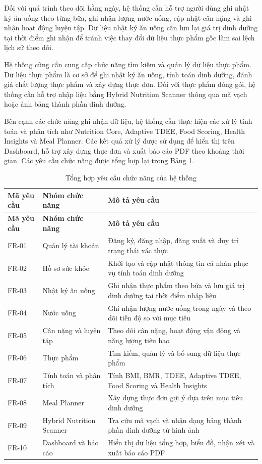\documentclass[12pt, a4paper]{report}
\begin{document}
Đối với quá trình theo dõi hằng ngày, hệ thống cần hỗ trợ người dùng ghi nhật ký ăn uống theo từng bữa, ghi nhận lượng nước uống, cập nhật cân nặng và ghi nhận hoạt động luyện tập. Dữ liệu nhật ký ăn uống cần lưu lại giá trị dinh dưỡng tại thời điểm ghi nhận để tránh việc thay đổi dữ liệu thực phẩm gốc làm sai lệch lịch sử theo dõi.

Hệ thống cũng cần cung cấp chức năng tìm kiếm và quản lý dữ liệu thực phẩm. Dữ liệu thực phẩm là cơ sở để ghi nhật ký ăn uống, tính toán dinh dưỡng, đánh giá chất lượng thực phẩm và xây dựng thực đơn. Đối với thực phẩm đóng gói, hệ thống cần hỗ trợ nhập liệu bằng Hybrid Nutrition Scanner thông qua mã vạch hoặc ảnh bảng thành phần dinh dưỡng.

Bên cạnh các chức năng ghi nhận dữ liệu, hệ thống cần thực hiện các xử lý tính toán và phân tích như Nutrition Core, Adaptive TDEE, Food Scoring, Health Insights và Meal Planner. Các kết quả xử lý được sử dụng để hiển thị trên Dashboard, hỗ trợ xây dựng thực đơn và xuất báo cáo PDF theo khoảng thời gian. Các yêu cầu chức năng được tổng hợp lại trong Bảng \ref{tab:tong_hop_chuc_nang_2}.

\begin{longtable}{|>{\raggedright\arraybackslash}p{4cm}|>{\raggedright\arraybackslash}p{4cm}|p{7cm}|}
\caption{Tổng hợp yêu cầu chức năng của hệ thống} \label{tab:tong_hop_chuc_nang_2} \\
\hline
\textbf{Mã yêu cầu} & \textbf{Nhóm chức năng} & \textbf{Mô tả yêu cầu} \\
\hline
\endfirsthead
\hline
\textbf{Mã yêu cầu} & \textbf{Nhóm chức năng} & \textbf{Mô tả yêu cầu} \\
\hline
\endhead

FR-01 & Quản lý tài khoản & Đăng ký, đăng nhập, đăng xuất và duy trì trạng thái xác thực \\
\hline
FR-02 & Hồ sơ sức khỏe & Khởi tạo và cập nhật thông tin cá nhân phục vụ tính toán dinh dưỡng \\
\hline
FR-03 & Nhật ký ăn uống & Ghi nhận thực phẩm theo bữa và lưu giá trị dinh dưỡng tại thời điểm nhập liệu \\
\hline
FR-04 & Nước uống & Ghi nhận lượng nước uống trong ngày và theo dõi tiến độ so với mục tiêu \\
\hline
FR-05 & Cân nặng và luyện tập & Theo dõi cân nặng, hoạt động vận động và năng lượng tiêu hao \\
\hline
FR-06 & Thực phẩm & Tìm kiếm, quản lý và bổ sung dữ liệu thực phẩm \\
\hline
FR-07 & Tính toán và phân tích & Tính BMI, BMR, TDEE, Adaptive TDEE, Food Scoring và Health Insights \\
\hline
FR-08 & Meal Planner & Xây dựng thực đơn gợi ý dựa trên mục tiêu dinh dưỡng \\
\hline
FR-09 & Hybrid Nutrition Scanner & Tra cứu mã vạch và nhận dạng bảng thành phần dinh dưỡng từ hình ảnh \\
\hline
FR-10 & Dashboard và báo cáo & Hiển thị dữ liệu tổng hợp, biểu đồ, nhận xét và xuất báo cáo PDF \\
\hline
\end{longtable}
\end{document}
